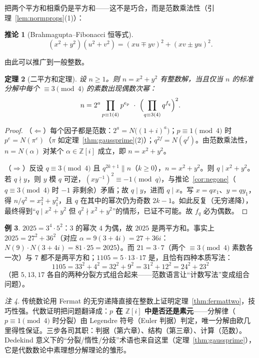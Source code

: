 \documentclass[a4paper,11pt]{ctexart}
\numberwithin{equation}{section}
\theoremstyle{plain}
\newtheorem{theorem}{定理}[section]
\newtheorem{corollary}[theorem]{推论}
\theoremstyle{definition}
\newtheorem{example}[theorem]{例}
\theoremstyle{remark}
\newtheorem{remark}[theorem]{注}
\newcommand{\Ga}{\mathbb{Z}[i]}
\begin{document}
把两个平方和相乘仍是平方和——这不是巧合，而是范数乘法性（引理~\ref{lem:normprops}(1)）：

\begin{corollary}[Brahmagupta--Fibonacci 恒等式]\label{cor:brahmagupta}
\[
(x^2+y^2)(u^2+v^2)=(xu\mp yv)^2+(xv\pm yu)^2 .
\]
\end{corollary}

由此可以推广到一般整数。

\begin{theorem}[二平方和定理]\label{thm:twosquares}
设 $n\ge1$。则 $n=x^2+y^2$ 有整数解，当且仅当 $n$ 的标准分解中每个 $\equiv3\pmod4$ 的素数出现偶数次幂：
\[
n=2^{a}\prod_{p\equiv1(4)}p^{e_p}\ \cdot\ \Bigl(\prod_{q\equiv3(4)}q^{f_q}\Bigr)^{2}.
\]
\end{theorem}

\begin{proof}
（$\Leftarrow$）每个因子都是范数：$2^a=N\bigl((1+i)^a\bigr)$；$p\equiv1\pmod4$ 时 $p^e=N(\pi^e)$（$\pi$ 如定理~\ref{thm:gaussprime}(2)）；$q^{2f}=N(q^f)$。由范数乘法性，$n=N(\alpha)$ 对某个 $\alpha\in\Ga$ 成立，即 $n=x^2+y^2$。

（$\Rightarrow$）反设 $q\equiv3\pmod4$ 且 $q^{2k+1}\parallel n$（$k\ge0$），$n=x^2+y^2$。则 $q\mid x^2+y^2$。若 $q\nmid y$，则 $y$ 模 $q$ 可逆，$(xy^{-1})^2\equiv-1\pmod q$，与推论~\ref{cor:negone}（$q\equiv3\pmod4$ 时 $-1$ 非剩余）矛盾；故 $q\mid y$，进而 $q\mid x$。写 $x=qx_1$、$y=qy_1$，得 $n/q^2=x_1^2+y_1^2$，且 $q$ 在其中的幂次仍为奇数 $2k-1$。如此反复（无穷递降），最终得到“$q\mid x^2+y^2$ 但 $q^2\nmid x^2+y^2$”的情形，已证不可能。故 $f_q$ 必为偶数。
\end{proof}

\begin{example}
$2025=3^4\cdot5^2$：$3$ 的幂次 $4$ 为偶，故 $2025$ 是两平方和。事实上 $2025=27^2+36^2$（对应 $\alpha=9(3+4i)=27+36i$：$N(9)\cdot N(3+4i)=81\cdot25=2025$）。而 $21=3\cdot7$（两个 $\equiv3\pmod4$ 素数各一次）与 $7$ 都不是两平方和；$1105=5\cdot13\cdot17$ 是，且恰有四种本质写法：
\[
1105=33^2+4^2=32^2+9^2=31^2+12^2=24^2+23^2
\]
（把 $5,13,17$ 各自的两种分裂方式组合起来——范数语言让“计数写法”变成组合问题）。
\end{example}

\begin{remark}
传统数论用 Fermat 的无穷递降直接在整数上证明定理~\ref{thm:fermattwo}，技巧性强。代数证明把问题翻译成：\textbf{$p$ 在 $\Ga$ 中是否还是素元}——分解律（$p\equiv1\pmod4$ 时分裂）由 Legendre 符号（Euler 判据）判定，唯一分解由欧几里得性保证。三步各司其职：判据（第六章）、结构（第三章）、计算（范数）。Dedekind 意义下的“分裂/惰性/分歧”术语也来自这里（定理~\ref{thm:gaussprime}），它是代数数论中素理想分解理论的雏形。
\end{remark}
\end{document}
